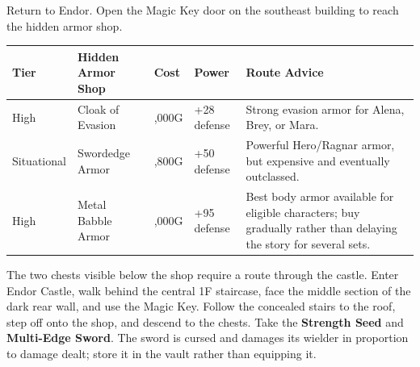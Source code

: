 \documentclass[
  american,
  10pt,
  letterpaper,
  oneside,
  open=any]{scrreprt}
\newcounter{none} %
\newenvironment{guidetable}{%
  \small\setstretch{1.0}%
  \setlength{\tabcolsep}{4pt}%
  \setlength{\LTpre}{8pt}\setlength{\LTpost}{10pt}%
  \renewcommand{\arraystretch}{1.16}%
}{ }
\begin{document}
Return to Endor. Open the Magic Key door on the southeast building to
reach the hidden armor shop.

\begin{guidetable}

{\def\LTcaptype{none} %
\begin{longtable}[]{@{}
  >{\raggedright\arraybackslash}p{}
  >{\raggedright\arraybackslash}p{}
  >{\raggedleft\arraybackslash}p{}
  >{\raggedleft\arraybackslash}p{}
  >{\raggedright\arraybackslash}p{}@{}}
\toprule\noalign{}
\begin{minipage}[b]{\linewidth}\raggedright
\color{GuideGreen}\bfseries Tier
\end{minipage} & \begin{minipage}[b]{\linewidth}\raggedright
\color{GuideGreen}\bfseries Hidden Armor Shop
\end{minipage} & \begin{minipage}[b]{\linewidth}\raggedleft
\color{GuideGreen}\bfseries Cost
\end{minipage} & \begin{minipage}[b]{\linewidth}\raggedleft
\color{GuideGreen}\bfseries Power
\end{minipage} & \begin{minipage}[b]{\linewidth}\raggedright
\color{GuideGreen}\bfseries Route Advice
\end{minipage} \\
\midrule\noalign{}
\endhead
\bottomrule\noalign{}
\endlastfoot
High & Cloak of Evasion & 3,000G & +28 defense & Strong evasion armor
for Alena, Brey, or Mara. \\
Situational & Swordedge Armor & 9,800G & +50 defense & Powerful
Hero/Ragnar armor, but expensive and eventually outclassed. \\
High & Metal Babble Armor & 15,000G & +95 defense & Best body armor
available for eligible characters; buy gradually rather than delaying
the story for several sets. \\
\end{longtable}
}

\end{guidetable}

The two chests visible below the shop require a route through the
castle. Enter Endor Castle, walk behind the central 1F staircase, face
the middle section of the dark rear wall, and use the Magic Key. Follow
the concealed stairs to the roof, step off onto the shop, and descend to
the chests. Take the \textbf{Strength Seed} and \textbf{Multi-Edge
Sword}. The sword is cursed and damages its wielder in proportion to
damage dealt; store it in the vault rather than equipping it.
\end{document}
